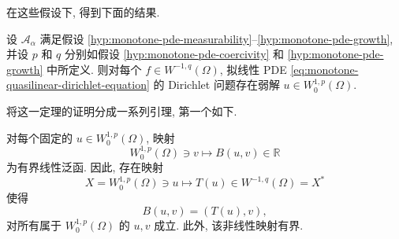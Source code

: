 在这些假设下, 得到下面的结果.

\begin{Theorem}
\label{thm:monotone-quasilinear-dirichlet-existence}
设 $\mathcal{A}_\alpha$ 满足假设 \ref{hyp:monotone-pde-measurability}--\ref{hyp:monotone-pde-growth}, 并设 $p$ 和 $q$ 分别如假设 \ref{hyp:monotone-pde-coercivity} 和 \ref{hyp:monotone-pde-growth} 中所定义. 则对每个 $f\in W^{-1,q}(\Omega)$, 拟线性 PDE \eqref{eq:monotone-quasilinear-dirichlet-equation} 的 Dirichlet 问题存在弱解 $u\in W_0^{1,p}(\Omega)$.
\end{Theorem}

将这一定理的证明分成一系列引理, 第一个如下.

\begin{Lemma}
\label{lem:monotone-pde-induced-bounded-dual-mapping}
对每个固定的 $u\in W_0^{1,p}(\Omega)$, 映射
\begin{equation}\label{eq:monotone-pde-bounded-test-functional}
W_0^{1,p}(\Omega)\ni v\mapsto B(u,v)\in\mathbb{R}
\end{equation}
为有界线性泛函. 因此, 存在映射
\begin{equation}\label{eq:monotone-pde-induced-dual-mapping}
X=W_0^{1,p}(\Omega)\ni u\mapsto T(u)\in W^{-1,q}(\Omega)=X^*
\end{equation}
使得
\begin{equation}\label{eq:monotone-pde-induced-duality-pairing}
B(u,v)=(T(u),v),
\end{equation}
对所有属于 $W_0^{1,p}(\Omega)$ 的 $u,v$ 成立. 此外, 该非线性映射有界.
\end{Lemma}

